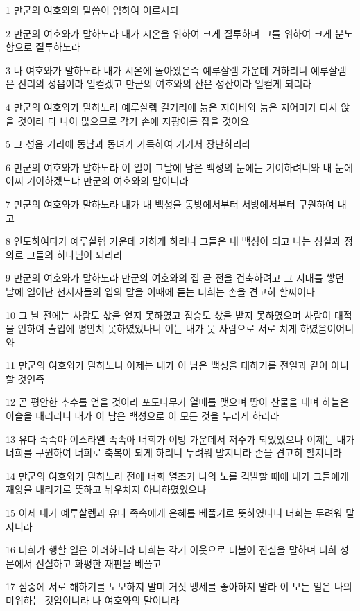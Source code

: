 \par 1 만군의 여호와의 말씀이 임하여 이르시되
\par 2 만군의 여호와가 말하노라 내가 시온을 위하여 크게 질투하며 그를 위하여 크게 분노함으로 질투하노라
\par 3 나 여호와가 말하노라 내가 시온에 돌아왔은즉 예루살렘 가운데 거하리니 예루살렘은 진리의 성읍이라 일컫겠고 만군의 여호와의 산은 성산이라 일컫게 되리라
\par 4 만군의 여호와가 말하노라 예루살렘 길거리에 늙은 지아비와 늙은 지어미가 다시 앉을 것이라 다 나이 많으므로 각기 손에 지팡이를 잡을 것이요
\par 5 그 성읍 거리에 동남과 동녀가 가득하여 거기서 장난하리라
\par 6 만군의 여호와가 말하노라 이 일이 그날에 남은 백성의 눈에는 기이하려니와 내 눈에 어찌 기이하겠느냐 만군의 여호와의 말이니라
\par 7 만군의 여호와가 말하노라 내가 내 백성을 동방에서부터 서방에서부터 구원하여 내고
\par 8 인도하여다가 예루살렘 가운데 거하게 하리니 그들은 내 백성이 되고 나는 성실과 정의로 그들의 하나님이 되리라
\par 9 만군의 여호와가 말하노라 만군의 여호와의 집 곧 전을 건축하려고 그 지대를 쌓던 날에 일어난 선지자들의 입의 말을 이때에 듣는 너희는 손을 견고히 할찌어다
\par 10 그 날 전에는 사람도 삯을 얻지 못하였고 짐승도 삯을 받지 못하였으며 사람이 대적을 인하여 출입에 평안치 못하였었나니 이는 내가 뭇 사람으로 서로 치게 하였음이어니와
\par 11 만군의 여호와가 말하노니 이제는 내가 이 남은 백성을 대하기를 전일과 같이 아니할 것인즉
\par 12 곧 평안한 추수를 얻을 것이라 포도나무가 열매를 맺으며 땅이 산물을 내며 하늘은 이슬을 내리리니 내가 이 남은 백성으로 이 모든 것을 누리게 하리라
\par 13 유다 족속아 이스라엘 족속아 너희가 이방 가운데서 저주가 되었었으나 이제는 내가 너희를 구원하여 너희로 축복이 되게 하리니 두려워 말지니라 손을 견고히 할지니라
\par 14 만군의 여호와가 말하노라 전에 너희 열조가 나의 노를 격발할 때에 내가 그들에게 재앙을 내리기로 뜻하고 뉘우치지 아니하였었으나
\par 15 이제 내가 예루살렘과 유다 족속에게 은혜를 베풀기로 뜻하였나니 너희는 두려워 말지니라
\par 16 너희가 행할 일은 이러하니라 너희는 각기 이웃으로 더불어 진실을 말하며 너희 성문에서 진실하고 화평한 재판을 베풀고
\par 17 심중에 서로 해하기를 도모하지 말며 거짓 맹세를 좋아하지 말라 이 모든 일은 나의 미워하는 것임이니라 나 여호와의 말이니라
